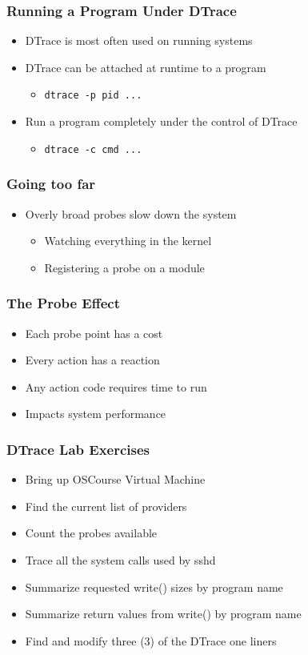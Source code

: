 \documentclass[pdftex]{beamer}
\begin{document}
\begin{frame}[fragile]
  \frametitle{Running a Program Under DTrace}
  \begin{itemize}
  \item DTrace is most often used on running systems
  \item DTrace can be attached at runtime to a program
    \begin{itemize}
    \item \verb+dtrace -p pid ...+
    \end{itemize}
  \item Run a program completely under the control of DTrace
    \begin{itemize}
    \item \verb+dtrace -c cmd ...+
    \end{itemize}
  \end{itemize}
\end{frame}

\begin{frame}
  \frametitle{Going too far}
  \begin{itemize}
  \item Overly broad probes slow down the system
    \begin{itemize}
    \item Watching everything in the kernel
    \item Registering a probe on a module
    \end{itemize}
  \end{itemize}
\end{frame}

\begin{frame}
  \frametitle{The Probe Effect}
  \begin{itemize}
  \item Each probe point has a cost
  \item Every action has a reaction
  \item Any action code requires time to run
  \item Impacts system performance
  \end{itemize}
\end{frame}

\begin{frame}
  \frametitle{DTrace Lab Exercises}
  \begin{itemize}
  \item Bring up OSCourse Virtual Machine
  \item Find the current list of providers
  \item Count the probes available
  \item Trace all the system calls used by sshd
  \item Summarize requested write() sizes by program name
  \item Summarize return values from write() by program name
  \item Find and modify three (3) of the DTrace one liners
  \end{itemize}
\end{frame}
\end{document}
